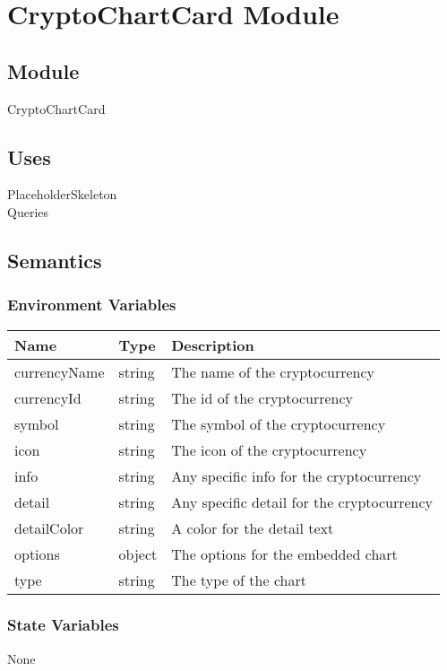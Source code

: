 \documentclass[12pt]{article}
\begin{document}
\section{CryptoChartCard Module}

\subsection{Module}
CryptoChartCard

\subsection{Uses}
PlaceholderSkeleton \\
Queries 

\subsection{Semantics}
\subsubsection{Environment Variables}
\begin{tabular}{| l | l | p{10cm} |}
    \hline
    \textbf{Name} & \textbf{Type} & \textbf{Description}\\ \hline
    currencyName & string & The name of the cryptocurrency\\ \hline
    currencyId & string & The id of the cryptocurrency\\ \hline
    symbol & string & The symbol of the cryptocurrency\\ \hline
    icon & string & The icon of the cryptocurrency\\ \hline
    info & string & Any specific info for the cryptocurrency\\ \hline
    detail & string & Any specific detail for the cryptocurrency\\ \hline
    detailColor & string & A color for the detail text\\ \hline
    options & object & The options for the embedded chart\\ \hline
    type & string & The type of the chart\\ \hline
\end{tabular}

\subsubsection{State Variables}
None
\end{document}
